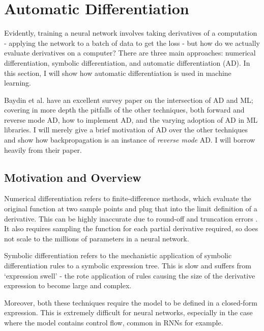 \section{Automatic Differentiation}
Evidently, training a neural network involves taking derivatives of a computation - applying the network to a batch of data to get the loss -
but how do we actually evaluate derivatives on a computer?
There are three main approaches: numerical differentiation, symbolic differentiation, and automatic differentiation (AD).
In this section, I will show how automatic differentiation is used in machine learning.

Baydin et al. \cite{Baydin2015} have an excellent survey paper on the intersection of AD and ML;
covering in more depth the pitfalls of the other techniques, both forward and reverse mode AD, how to implement AD, and the varying adoption of AD in ML libraries.
I will merely give a brief motivation of AD over the other techniques and show how backpropagation is an instance of \textit{reverse mode} AD.
I will borrow heavily from their paper.

\subsection{Motivation and Overview}
Numerical differentiation refers to finite-difference methods, which evaluate the original function at two sample points and plug that into the limit definition of a derivative.
This can be highly inaccurate due to round-off and truncation errors \cite{Jerrell1997}.
It also requires sampling the function for each partial derivative required, so does not scale to the millions of parameters in a neural network.

Symbolic differentiation refers to the mechanistic application of symbolic differentiation rules to a symbolic expression tree.
This is slow and suffers from `expression swell' \cite{Juedes1991} - the rote application of rules causing the size of the derivative expression to become large and complex.

Moreover, both these techniques require the model to be defined in a closed-form expression.
This is extremely difficult for neural networks, especially in the case where the model contains control flow, common in RNNs for example.

